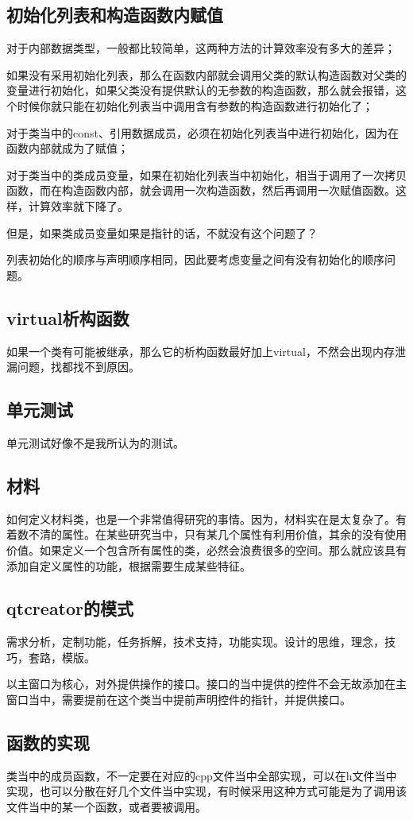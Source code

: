 \subsection{初始化列表和构造函数内赋值}
对于内部数据类型，一般都比较简单，这两种方法的计算效率没有多大的差异；

如果没有采用初始化列表，那么在函数内部就会调用父类的默认构造函数对父类的变量进行初始化，如果父类没有提供默认的无参数的构造函数，那么就会报错，这个时候你就只能在初始化列表当中调用含有参数的构造函数进行初始化了；

对于类当中的const、引用数据成员，必须在初始化列表当中进行初始化，因为在函数内部就成为了赋值；

对于类当中的类成员变量，如果在初始化列表当中初始化，相当于调用了一次拷贝函数，而在构造函数内部，就会调用一次构造函数，然后再调用一次赋值函数。这样，计算效率就下降了。

但是，如果类成员变量如果是指针的话，不就没有这个问题了？

列表初始化的顺序与声明顺序相同，因此要考虑变量之间有没有初始化的顺序问题。
\subsection{virtual析构函数}
如果一个类有可能被继承，那么它的析构函数最好加上virtual，不然会出现内存泄漏问题，找都找不到原因。
\subsection{单元测试}
单元测试好像不是我所认为的测试。
\subsection{材料}
如何定义材料类，也是一个非常值得研究的事情。因为，材料实在是太复杂了。有着数不清的属性。在某些研究当中，只有某几个属性有利用价值，其余的没有使用价值。如果定义一个包含所有属性的类，必然会浪费很多的空间。那么就应该具有添加自定义属性的功能，根据需要生成某些特征。
\subsection{qtcreator的模式}
需求分析，定制功能，任务拆解，技术支持，功能实现。设计的思维，理念，技巧，套路，模版。

以主窗口为核心，对外提供操作的接口。接口的当中提供的控件不会无故添加在主窗口当中，需要提前在这个类当中提前声明控件的指针，并提供接口。
\subsection{函数的实现}
类当中的成员函数，不一定要在对应的cpp文件当中全部实现，可以在h文件当中实现，也可以分散在好几个文件当中实现，有时候采用这种方式可能是为了调用该文件当中的某一个函数，或者要被调用。
